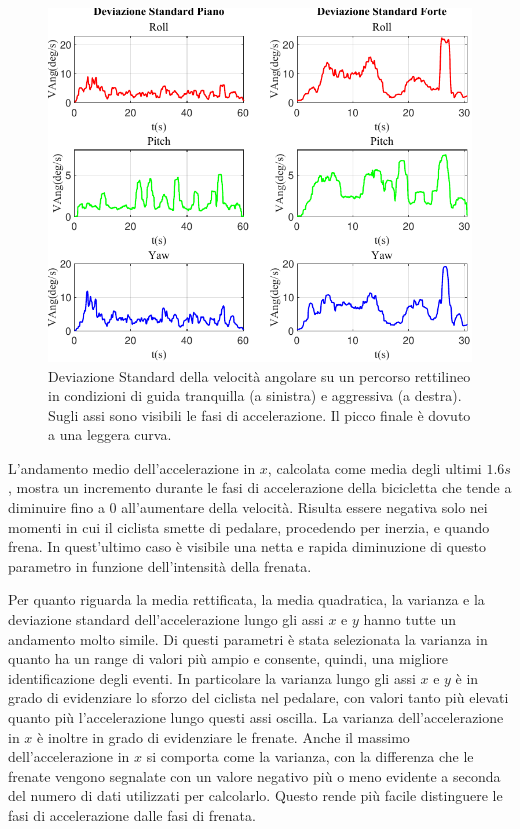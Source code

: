 \documentclass[class=article]{standalone}
\begin{document}
	\begin{center}
		\begin{figure}[h!]
			\centering\includegraphics[width=.7\textwidth]{img/lungaFP/VAng/Deviazione Standard}
			\caption[]{Deviazione Standard della velocità angolare su un percorso rettilineo in condizioni di guida tranquilla (a sinistra) e aggressiva (a destra). Sugli assi sono visibili le fasi di accelerazione. Il picco finale è dovuto a una leggera curva.}
			\label{fig:VAngStd_lungaFP}
		\end{figure}
	\end{center}
	
	L'andamento medio dell'accelerazione in \(x\), calcolata come media degli ultimi \(1.6s\), mostra un incremento durante le fasi di accelerazione della bicicletta che tende a diminuire fino a \(0\) all'aumentare della velocità.
	Risulta essere negativa solo nei momenti in cui il ciclista smette di pedalare, procedendo per inerzia, e quando frena. In quest'ultimo caso è visibile una netta e rapida diminuzione di questo parametro in funzione dell'intensità della frenata.
	
	Per quanto riguarda la media rettificata, la media quadratica, la varianza e la deviazione standard dell'accelerazione lungo gli assi \(x\) e \(y\) hanno tutte un andamento molto simile. Di questi parametri è stata selezionata la varianza in quanto ha un range di valori più ampio e consente, quindi, una migliore identificazione degli eventi. In particolare la varianza lungo gli assi \(x\) e \(y\) è in grado di evidenziare lo sforzo del ciclista nel pedalare, con valori tanto più elevati quanto più l'accelerazione lungo questi assi oscilla. La varianza dell'accelerazione in \(x\) è inoltre in grado di evidenziare le frenate.
	Anche il massimo dell'accelerazione in \(x\) si comporta come la varianza, con la differenza che le frenate vengono segnalate con un valore negativo più o meno evidente a seconda del numero di dati utilizzati per calcolarlo. Questo rende più facile distinguere le fasi di accelerazione dalle fasi di frenata.
	
\end{document}
